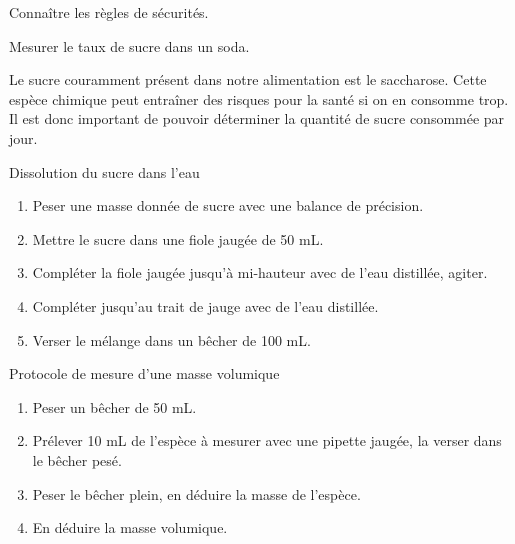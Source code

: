 \teteSndCorp



\begin{objectifs}
  \item Connaître les règles de sécurités.
  \item Mesurer le taux de sucre dans un soda.
\end{objectifs}

\begin{encart}
  
  Le sucre couramment présent dans notre alimentation est le saccharose.
  Cette espèce chimique peut entraîner des risques pour la santé si on en consomme trop.
  Il est donc important de pouvoir déterminer la quantité de sucre consommée par jour.
\end{encart}



\begin{doc}{Dissolution du sucre dans l'eau}
  \vspace*{-0.6cm}
  \begin{enumerate}
      \item Peser une masse donnée de sucre avec une balance de précision.
      \item Mettre le sucre dans une fiole jaugée de 50 mL.
      \item Compléter la fiole jaugée jusqu'à mi-hauteur avec de l'eau distillée, agiter.
      \item Compléter jusqu'au trait de jauge avec de l'eau distillée.
      \item Verser le mélange dans un bêcher de 100 mL.
  \end{enumerate}
\end{doc}

\begin{doc}{Protocole de mesure d'une masse volumique}
  \vspace*{-0.6cm}
  \begin{enumerate}
    \item Peser un bêcher de 50 mL.
    \item Prélever 10 mL de l'espèce à mesurer avec une pipette jaugée, la verser dans le bêcher pesé.
    \item Peser le bêcher plein, en déduire la masse de l'espèce.
    \item En déduire la masse volumique.
  \end{enumerate}
\end{doc}



